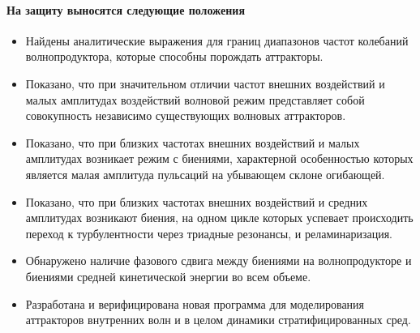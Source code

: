 \documentclass[utf8x]{G7-32} %
\begin{document}
\paragraph{На защиту выносятся следующие положения}
\begin{itemize}

  \item Найдены аналитические выражения для границ диапазонов частот колебаний волнопродуктора, которые способны порождать аттракторы.

  \item Показано, что при значительном отличии частот внешних воздействий и малых амплитудах воздействий волновой режим представляет собой совокупность независимо существующих волновых аттракторов.

  \item Показано, что при близких частотах внешних воздействий и малых амплитудах возникает режим с биениями, характерной особенностью которых является малая амплитуда пульсаций на убывающем склоне огибающей.

  \item Показано, что при близких частотах внешних воздействий и средних амплитудах возникают биения, на одном цикле которых успевает происходить переход к турбулентности через триадные резонансы, и реламинаризация.
    
  \item Обнаружено наличие фазового сдвига между биениями на волнопродукторе и биениями средней кинетической энергии во всем объеме.
    

  \item Разработана и верифицирована новая программа для моделирования аттракторов внутренних волн и в целом динамики стратифицированных сред.
    

    
    
    
\end{itemize}
\end{document}
